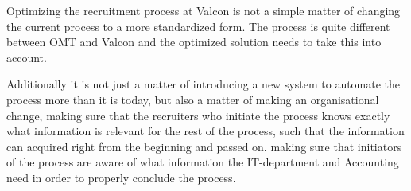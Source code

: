 Optimizing the recruitment process at Valcon is not a simple matter of changing the current process to a more standardized form.
The process is quite different between OMT and Valcon and the optimized solution needs to take this into account.

Additionally it is not just a matter of introducing a new system to automate the process more than it is today, but also a matter of making an organisational change,
making sure that the recruiters who initiate the process knows exactly what information is relevant for the rest of the process, such that the information can acquired right from the beginning and passed on.
 making sure that initiators of the process are aware of what information the IT-department and Accounting need in order to properly conclude the process.